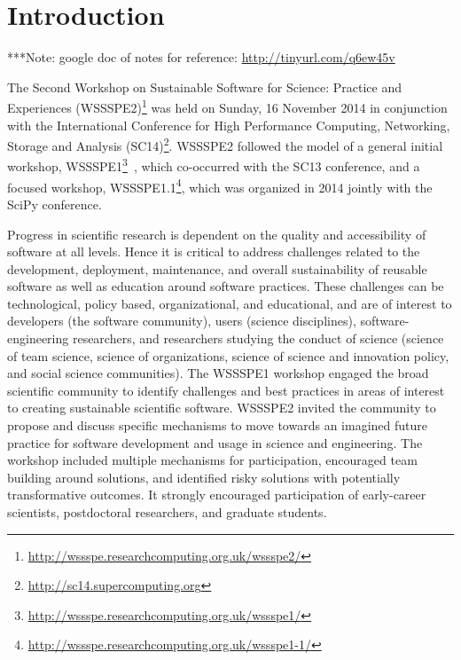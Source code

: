 \documentclass[11pt, oneside]{amsart}
\newcommand{\note}[1]{ {\textcolor{blueish}    { ***Note:      #1 }}}
\newcommand{\katznote}[1]{ {\textcolor{magenta}    { ***Dan:      #1 }}}
\newcommand{\gabnote}[1]{ {\textcolor{cyan}    { ***Gabrielle:     #1 }}}
\newcommand{\nchnote}[1]{  {\textcolor{orange}      { ***Neil: #1 }}}
\newcommand{\manishnote}[1]{  {\textcolor{violet}     { ***Manish: #1 }}}
\newcommand{\davidnote}[1]{  {\textcolor{darkgreen}      { ***David: #1 }}}
\begin{document}
\section{Introduction}

%
%
%
%


\note{google doc of notes for reference: \url{http://tinyurl.com/q6ew45v}}

The Second Workshop on Sustainable Software for Science: Practice and
Experiences
(WSSSPE2)\footnote{\url{http://wssspe.researchcomputing.org.uk/wssspe2/}} was
held on Sunday, 16 November 2014 in conjunction with the International
Conference for High Performance Computing, Networking, Storage and Analysis
(SC14)\footnote{\url{http://sc14.supercomputing.org}}. WSSSPE2 followed the
model of a general initial workshop,
WSSSPE1\footnote{\url{http://wssspe.researchcomputing.org.uk/wssspe1/}}~\cite{WSSSPE1-pre-report,WSSSPE1},
which co-occurred with the SC13 conference, and a focused workshop,
WSSSPE1.1\footnote{\url{http://wssspe.researchcomputing.org.uk/wssspe1-1/}},
which was organized in 2014 jointly with the SciPy conference.

Progress in scientific research is dependent on the quality and accessibility of
software at all levels. Hence it is critical to address challenges related to
the development, deployment, maintenance, and overall sustainability of reusable
software as well as education around software practices. These challenges can be
technological, policy based, organizational, and educational, and are of
interest to developers (the software community), users (science disciplines),
software-engineering researchers, and researchers studying the conduct of
science (science of team science, science of organizations, science of science
and innovation policy, and social science communities). The WSSSPE1 workshop
engaged the broad scientific community to identify challenges and best practices
in areas of interest to creating sustainable scientific software. WSSSPE2
invited the community to propose and discuss specific mechanisms to move towards
an imagined future practice for software development and usage in science and
engineering. The workshop included multiple mechanisms for participation,
encouraged team building around solutions, and identified risky solutions with
potentially transformative outcomes. It strongly encouraged participation of
early-career scientists, postdoctoral researchers, and graduate students.
\end{document}
